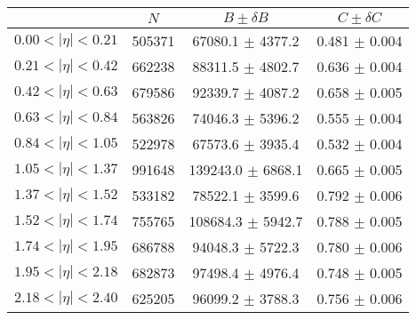 \begin{tabular}{lccc}
\hline
    &   $N$   & $B \pm \delta B$  &  $C \pm \delta C$ \\
\hline
$0.00 < |\eta| <0.21$          & 505371     & 67080.1    $\pm$ 4377.2 & 0.481      $\pm$ 0.004 \\
$0.21 < |\eta| <0.42$          & 662238     & 88311.5    $\pm$ 4802.7 & 0.636      $\pm$ 0.004 \\
$0.42 < |\eta| <0.63$          & 679586     & 92339.7    $\pm$ 4087.2 & 0.658      $\pm$ 0.005 \\
$0.63 < |\eta| <0.84$          & 563826     & 74046.3    $\pm$ 5396.2 & 0.555      $\pm$ 0.004 \\
$0.84 < |\eta| <1.05$          & 522978     & 67573.6    $\pm$ 3935.4 & 0.532      $\pm$ 0.004 \\
$1.05 < |\eta| <1.37$          & 991648     & 139243.0   $\pm$ 6868.1 & 0.665      $\pm$ 0.005 \\
$1.37 < |\eta| <1.52$          & 533182     & 78522.1    $\pm$ 3599.6 & 0.792      $\pm$ 0.006 \\
$1.52 < |\eta| <1.74$          & 755765     & 108684.3   $\pm$ 5942.7 & 0.788      $\pm$ 0.005 \\
$1.74 < |\eta| <1.95$          & 686788     & 94048.3    $\pm$ 5722.3 & 0.780      $\pm$ 0.006 \\
$1.95 < |\eta| <2.18$          & 682873     & 97498.4    $\pm$ 4976.4 & 0.748      $\pm$ 0.005 \\
$2.18 < |\eta| <2.40$          & 625205     & 96099.2    $\pm$ 3788.3 & 0.756      $\pm$ 0.006 \\
\hline
\end{tabular}
